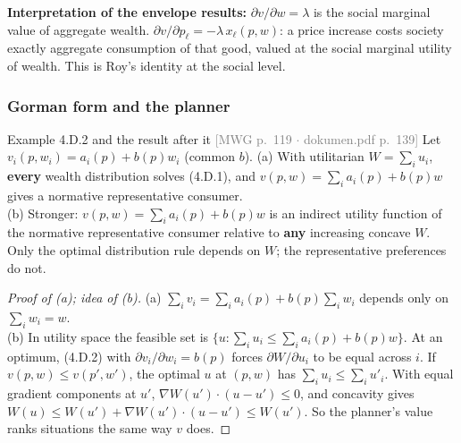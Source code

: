 \documentclass[11pt]{article}
\newcommand{\mwg}[2]{\hfill{\small\textcolor{gray}{[MWG p.~#1 $\cdot$ dokumen.pdf p.~#2]}}}
\begin{document}
\textbf{Interpretation of the envelope results:} $\partial v/\partial w=\lambda$ is the social marginal value of aggregate wealth. $\partial v/\partial p_\ell=-\lambda\,x_\ell(p,w)$: a price increase costs society exactly aggregate consumption of that good, valued at the social marginal utility of wealth. This is Roy's identity at the social level.

\subsubsection{Gorman form and the planner}\label{sec:gormanW}
\begin{prop}{Example 4.D.2 and the result after it \mwg{119}{139}}
Let $v_i(p,w_i)=a_i(p)+b(p)w_i$ (common $b$).
(a) With utilitarian $W=\sum_iu_i$, \textbf{every} wealth distribution solves (4.D.1), and $v(p,w)=\sum_ia_i(p)+b(p)w$ gives a normative representative consumer.\\
(b) Stronger: $v(p,w)=\sum_ia_i(p)+b(p)w$ is an indirect utility function of the normative representative consumer relative to \textbf{any} increasing concave $W$. Only the optimal distribution rule depends on $W$; the representative preferences do not.
\end{prop}
\begin{proof}[Proof of (a); idea of (b)]
(a) $\sum_iv_i=\sum_ia_i(p)+b(p)\sum_iw_i$ depends only on $\sum_iw_i=w$.\\
(b) In utility space the feasible set is $\{u:\sum_iu_i\le\sum_ia_i(p)+b(p)w\}$. At an optimum, (4.D.2) with $\partial v_i/\partial w_i=b(p)$ forces $\partial W/\partial u_i$ to be equal across $i$. If $v(p,w)\le v(p',w')$, the optimal $u$ at $(p,w)$ has $\sum_iu_i\le\sum_iu'_i$. With equal gradient components at $u'$, $\nabla W(u')\cdot(u-u')\le0$, and concavity gives $W(u)\le W(u')+\nabla W(u')\cdot(u-u')\le W(u')$. So the planner's value ranks situations the same way $v$ does.
\end{proof}
\end{document}
